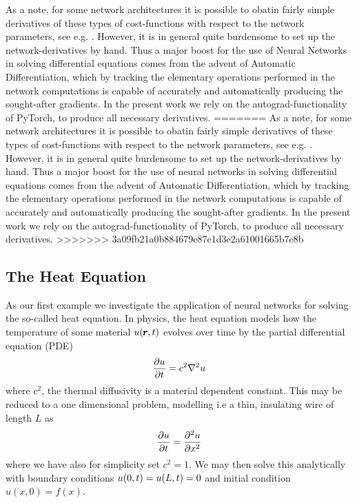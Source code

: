 \documentclass[reprint, english, nofootinbib]{revtex4-2}
\begin{document}
As a note, for some network architectures it is possible to obatin fairly simple derivatives of these types of cost-functions with respect to the network parameters, see e.g. \cite{Lagaris_1998}. However, it is in general quite burdensome to set up the network-derivatives by hand. Thus a major boost for the use of Neural Networks in solving differential equations comes from the advent of Automatic Differentiation, which by tracking the elementary operations performed in the network computations is capable of accurately and automatically producing the sought-after gradients. In the present work we rely on the autograd-functionality of PyTorch, to produce all necessary derivatives.
=======
As a note, for some network architectures it is possible to obatin fairly simple derivatives of these types of cost-functions with respect to the network parameters, see e.g. \cite{Lagaris_1998}. However, it is in general quite burdensome to set up the network-derivatives by hand. Thus a major boost for the use of neural networks in solving differential equations comes from the advent of Automatic Differentiation, which by tracking the elementary operations performed in the network computations is capable of accurately and automatically producing the sought-after gradients. In the present work we rely on the autograd-functionality of PyTorch, to produce all necessary derivatives.
>>>>>>> 3a09fb21a0b884679e87e1d3e2a61001665b7e8b


\subsection{The Heat Equation}

As our first example we investigate the application of neural networks for solving the so-called heat equation. In physics, the heat equation models how the temperature of some material $u\qty(\pmb r, t)$ evolves over time by the partial differential equation (PDE)
\begin{equation}
    \pdv{u}{t} = c^2\nabla^2 u 
\end{equation}
where $c^2$, the thermal diffusivity is a material dependent constant. 
This may be reduced to a one dimensional problem, modelling i.e a thin, insulating wire of length $L$ as
\begin{equation}\label{eqn: 1D heat eqn}
    \pdv{u}{t} = \pdv[2]{u}{x}
\end{equation}
where we have also for simplicity set $c^2 = 1$. We may then solve this analytically with boundary conditions $u\qty(0, t) = u\qty(L,t) = 0$ and initial condition $u(x, 0) = f(x)$.
\end{document}
